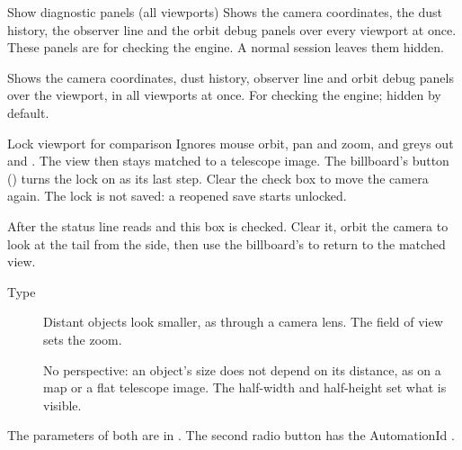 \begin{uipanel}
\begin{uiproperty}[key=diagnostics, id=DiagnosticPanelsCheckBox, type={check box},
    default={off}, effect=display, saved=prefs, help=Tabs_Settings_HelpViewDiagnostics]
  {Show diagnostic panels (all viewports)}
Shows the camera coordinates, the dust history, the observer line and the orbit debug panels
over every viewport at once. These panels are for checking the engine. A normal session
leaves them hidden.
\begin{uihelptext}
Shows the camera coordinates, dust history, observer line and orbit debug panels over the
viewport, in all viewports at once. For checking the engine; hidden by default.
\end{uihelptext}
\end{uiproperty}

\begin{uiproperty}[key=comparison-lock, id=ComparisonLockCheckBox, type={check box},
    default={off}, effect=camera, saved=none, help=Tabs_Settings_HelpViewComparisonLock]
  {Lock viewport for comparison}
Ignores mouse orbit, pan and zoom, and greys out  and
. The view then stays matched to a telescope image. The
billboard's  button ()
turns the lock on as its last step. Clear the check box to move the camera again. The lock is
not saved: a reopened save starts unlocked.
\begin{uiexample}
After  the status line reads  and this box is checked. Clear it, orbit the camera to look at the tail from
the side, then use the billboard's  to return to the matched
view.
\end{uiexample}
\end{uiproperty}


\begin{uiproperty}[key=type, id=ProjectionPerspective, type={radio buttons},
    range={\uilabel{Perspective}, \uilabel{Orthographic}}, default={\uilabel{Perspective}},
    effect=camera, saved=file, visible={always; disabled while the viewport is locked},
    help=Tabs_Settings_HelpViewProjectionType]{Type}
\begin{description}
  \item[] Distant objects look smaller, as through a camera lens. The
    field of view sets the zoom.
  \item[] No perspective: an object's size does not depend on its
    distance, as on a map or a flat telescope image. The half-width and half-height set what
    is visible.
\end{description}
The parameters of both are in . The second radio button has
the AutomationId .
\end{uiproperty}


\end{uipanel}
